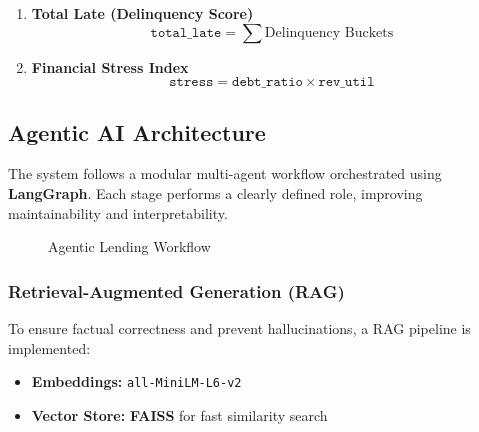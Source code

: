 \documentclass[conference]{IEEEtran}
\begin{document}
\begin{enumerate}
\item \textbf{Total Late (Delinquency Score)}
\begin{equation}
\texttt{total\_late} = \sum \text{Delinquency Buckets}
\end{equation}

\item \textbf{Financial Stress Index}
\begin{equation}
\texttt{stress} = \texttt{debt\_ratio} \times \texttt{rev\_util}
\end{equation}
\end{enumerate}

\subsection{Agentic AI Architecture}
The system follows a modular multi-agent workflow orchestrated using \textbf{LangGraph}. Each stage performs a clearly defined role, improving maintainability and interpretability.

\begin{figure}[H]
\centering
{}
\caption{Agentic Lending Workflow}
\vspace{-0.3cm}
\end{figure}

\subsubsection{Retrieval-Augmented Generation (RAG)}
To ensure factual correctness and prevent hallucinations, a RAG pipeline is implemented:

\begin{itemize}
\item \textbf{Embeddings:} \texttt{all-MiniLM-L6-v2}
\item \textbf{Vector Store:} \textbf{FAISS} for fast similarity search
\end{itemize}
\end{document}
